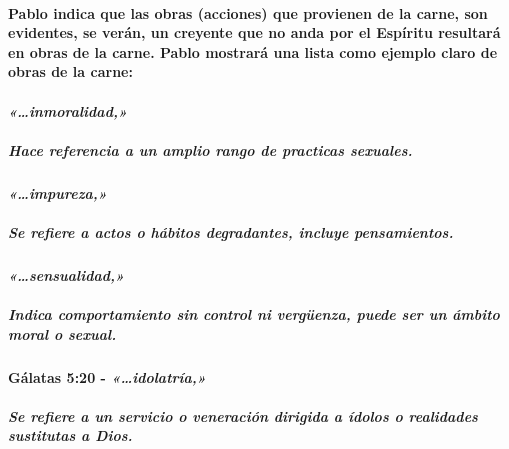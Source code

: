 \documentclass[11a pt,twoside]{article}
\newcommand{\scripture}[1]{%
  {\fontsize{12pt}{16pt}\selectfont\ScriptureFont\itshape #1}%
}
\let\oldparagraph\paragraph
\renewcommand{\paragraph}{\needspace{3\baselineskip}\oldparagraph}
\let\oldsubparagraph\subparagraph
\renewcommand{\subparagraph}{\needspace{2\baselineskip}\oldsubparagraph}
\begin{document}
\paragraph{Pablo indica que las obras (acciones) que provienen de la
carne, son evidentes, se verán, un creyente que no anda por el Espíritu
resultará en obras de la carne. Pablo mostrará una lista como ejemplo
claro de obras de la
carne:}\label{pablo-indica-que-las-obras-acciones-que-provienen-de-la-carne-son-evidentes-se-veruxe1n-un-creyente-que-no-anda-por-el-espuxedritu-resultaruxe1-en-obras-de-la-carne.-pablo-mostraruxe1-una-lista-como-ejemplo-claro-de-obras-de-la-carne}

\paragraph{\texorpdfstring{\scripture{«…inmoralidad,»}}{}}\label{inmoralidad}

\subparagraph{Hace referencia a un amplio rango de practicas
sexuales.}\label{hace-referencia-a-un-amplio-rango-de-practicas-sexuales.}

\paragraph{\texorpdfstring{\scripture{«…impureza,»}}{}}\label{impureza}

\subparagraph{Se refiere a actos o hábitos degradantes, incluye
pensamientos.}\label{se-refiere-a-actos-o-huxe1bitos-degradantes-incluye-pensamientos.}

\paragraph{\texorpdfstring{\scripture{«…sensualidad,»}}{}}\label{sensualidad}

\subparagraph{Indica comportamiento sin control ni vergüenza, puede ser
un ámbito moral o
sexual.}\label{indica-comportamiento-sin-control-ni-verguxfcenza-puede-ser-un-uxe1mbito-moral-o-sexual.}

\paragraph{\texorpdfstring{Gálatas 5:20 -
\scripture{«…idolatría,»}}{Gálatas 5:20 - }}\label{guxe1latas-520---idolatruxeda}

\subparagraph{Se refiere a un servicio o veneración dirigida a ídolos o
realidades sustitutas a
Dios.}\label{se-refiere-a-un-servicio-o-veneraciuxf3n-dirigida-a-uxeddolos-o-realidades-sustitutas-a-dios.}
\end{document}
